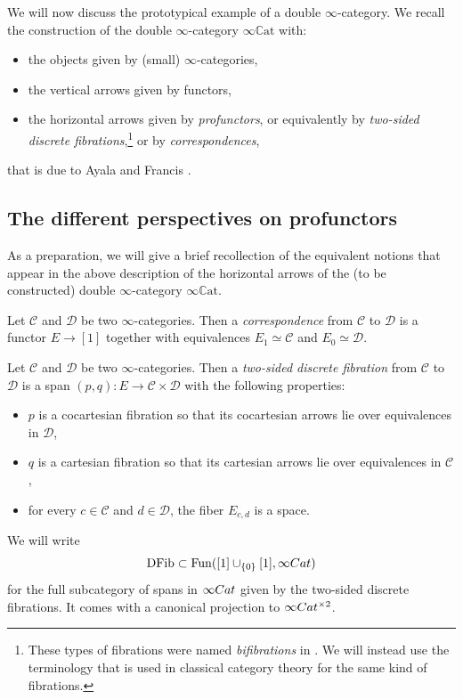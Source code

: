\documentclass[a4paper, 11pt]{amsart}
\numberwithin{theorem}{section}
\theoremstyle{definition}
\newcommand{\cat}[1]{\textup{#1}}
\newcommand{\fun}{\mathrm{Fun}}
\newcommand{\Cat}{\cat{Cat}}
\newcommand{\C}{\mathscr{C}}
\renewcommand{\D}{\mathscr{D}}
\newcommand{\DFib}{\mathrm{DFib}}
\newcommand{\CCAT}{\mathbb{C}\mathrm{at}}
\begin{document}
We will now discuss the prototypical example of a double $\infty$-category. We recall the construction of 
 the double $\infty$-category 
$
\infty\CCAT  
$
with:
\begin{itemize} 
	\item the objects given by (small) $\infty$-categories,
	\item the vertical arrows given by functors,
	\item the horizontal arrows given by \textit{profunctors}, or equivalently by \textit{two-sided discrete fibrations},\footnote{These types of fibrations were named \textit{bifibrations} in \cite{HTT}. We will instead 
	use the terminology that is used in classical category theory for the same kind of fibrations.} or by \textit{correspondences},
\end{itemize}
that is due to Ayala and Francis \cite{AyalaFrancis}.

\subsection{The different perspectives on profunctors}\label{ssection.profunctors}

As a preparation, we will give a brief recollection of the equivalent notions that appear in the above 
description of the horizontal arrows of the (to be constructed) double $\infty$-category $\infty\CCAT$.

\begin{definition}
	Let $\C$ and $\D$ be two $\infty$-categories. Then a \textit{correspondence} 
	from $\C$ to $\D$ is a functor 
	$
	E \rightarrow [1]
	$
	together with equivalences $E_1 \simeq \C$ and $E_0 \simeq \D$. 
\end{definition}

\begin{definition}
	Let $\C$ and $\D$ be two $\infty$-categories.  Then a \textit{two-sided discrete fibration} from $\C$ to $\D$
	is a span 
	$
		(p,q) : E \rightarrow \C \times \D
		$
	with the following properties:
	\begin{itemize}
		\item $p$ is a cocartesian fibration so that its cocartesian arrows lie 
		over equivalences in $\D$,
		\item $q$ is a cartesian fibration so that its cartesian arrows lie over equivalences in $\C$,
		\item for every $c\in \C$ and $d \in \D$, the fiber $E_{c,d}$ is a space.
	\end{itemize}
	We will write
	$$
\DFib \subset \fun([1] \cup_{\{0\}} [1], \infty\Cat)
$$
	for the full subcategory of spans in $\infty\Cat$ given by the two-sided discrete fibrations. It comes 
	with a canonical projection to $\infty\Cat^{\times 2}$.
\end{definition}
\end{document}
